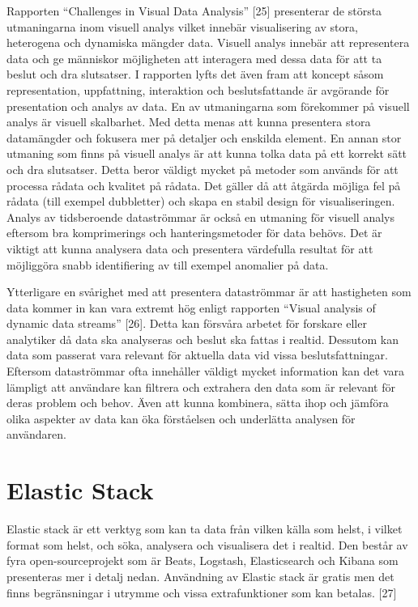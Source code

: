 \documentclass{kththesis}
\begin{document}
Rapporten “Challenges in Visual Data Analysis” [25] presenterar de största utmaningarna inom visuell analys vilket innebär visualisering av stora, heterogena och dynamiska mängder data. Visuell analys innebär att representera data och ge människor möjligheten att interagera med dessa data för att ta beslut och dra slutsatser. I rapporten lyfts det även fram att koncept såsom representation, uppfattning, interaktion och beslutsfattande är avgörande för presentation och analys av data. En av utmaningarna som förekommer på visuell analys är visuell skalbarhet. Med detta menas att kunna presentera stora datamängder och fokusera mer på detaljer och enskilda element. En annan stor utmaning som finns på visuell analys är att kunna tolka data på ett korrekt sätt och dra slutsatser. Detta beror väldigt mycket på metoder som används för att processa rådata och kvalitet på rådata. Det gäller då att åtgärda möjliga fel på rådata (till exempel dubbletter) och skapa en stabil design för visualiseringen. Analys av tidsberoende dataströmmar är också en utmaning för visuell analys eftersom bra komprimerings och hanteringsmetoder för data behövs. Det är viktigt att kunna analysera data och presentera värdefulla resultat för att möjliggöra snabb identifiering av till exempel anomalier på data. 

Ytterligare en svårighet med att presentera dataströmmar är att hastigheten som data kommer in kan vara extremt hög enligt rapporten “Visual analysis of dynamic data streams” [26]. Detta kan försvåra arbetet för forskare eller analytiker då data ska analyseras och beslut ska fattas i realtid. Dessutom kan data som passerat vara relevant för aktuella data vid vissa beslutsfattningar. Eftersom dataströmmar ofta innehåller väldigt mycket information kan det vara lämpligt att användare kan filtrera och extrahera den data som är relevant för deras problem och behov. Även att kunna kombinera, sätta ihop och jämföra olika aspekter av data kan öka förståelsen och underlätta analysen för användaren. 

\section{Elastic Stack} 

Elastic stack är ett verktyg som kan ta data från vilken källa som helst, i vilket format som helst, och söka, analysera och visualisera det i realtid. Den består av fyra open-sourceprojekt som är Beats, Logstash, Elasticsearch och Kibana som presenteras mer i detalj nedan. Användning av Elastic stack är gratis men det finns begränsningar i utrymme och vissa extrafunktioner som kan betalas. [27]
\end{document}
